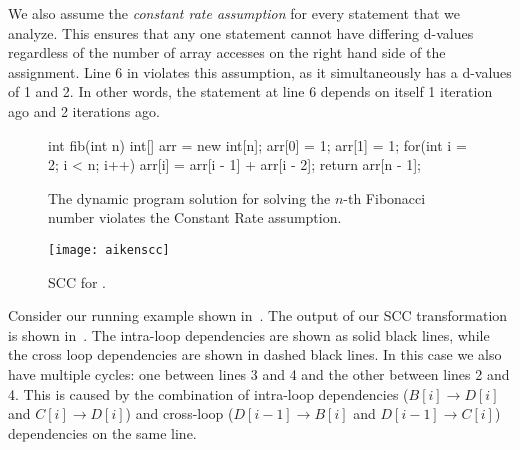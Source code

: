 We also assume the \emph{constant rate assumption} for every statement that we analyze. This ensures
that any one statement cannot have differing d-values regardless of the number of array accesses on the 
right hand side of the assignment. Line 6 in  violates this assumption,
as it simultaneously has a d-values of 1 and 2. In other words, the statement at line 6 depends on itself
1 iteration ago and 2 iterations ago. 

\begin{figure}[h]
\centering
\begin{minipage}{0.7\textwidth}
\begin{javacode}
int fib(int n) {
    int[] arr = new int[n];
    arr[0] = 1;
    arr[1] = 1;
    for(int i = 2; i < n; i++) {
        arr[i] = arr[i - 1] + arr[i - 2];
    }
    return arr[n - 1];
}
\end{javacode}
\end{minipage}
\caption{The dynamic program solution for solving the $n$-th Fibonacci number violates the Constant Rate
assumption.}
\label{fig:fibconstantrate}
\end{figure}

\begin{figure}[h]
\centering
\begin{minipage}{0.50\textwidth}
\texttt{[image: aikenscc]}
\end{minipage}
\caption{SCC for .}  
\label{fig:aikenscc}  
\end{figure}

Consider our running example shown in~. 
The output of our SCC transformation is shown in~. The intra-loop dependencies are shown
as solid black lines, while the cross loop dependencies are shown in dashed black lines. In this case 
we also have multiple cycles: one between lines 3 and 4 and the other between lines 2 and 4. This is caused
by the combination of intra-loop dependencies ($B[i] \rightarrow D[i]$ and $C[i] \rightarrow D[i]$) and
cross-loop ($D[i - 1] \rightarrow B[i]$ and $D[i - 1] \rightarrow C[i]$) dependencies on the same line.


